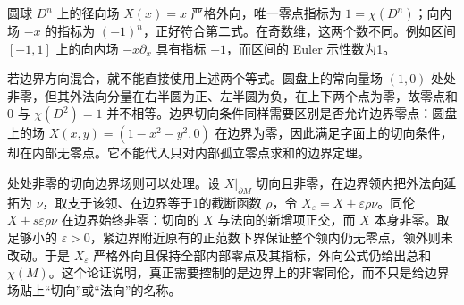圆球 \(D^n\) 上的径向场 \(X(x)=x\) 严格外向，唯一零点指标为 \(1=\chi(D^n)\)；向内场 \(-x\) 的指标为 \((-1)^n\)，正好符合第二式。在奇数维，这两个数不同。例如区间 \([-1,1]\) 上的向内场 \(-x\partial_x\) 具有指标 \(-1\)，而区间的 Euler 示性数为1。

\ProseParagraphBreak

若边界方向混合，就不能直接使用上述两个等式。圆盘上的常向量场 \((1,0)\) 处处非零，但其外法向分量在右半圆为正、左半圆为负，在上下两个点为零，故零点和 \(0\) 与 \(\chi(D^2)=1\) 并不相等。边界切向条件同样需要区别是否允许边界零点：圆盘上的场 \(X(x,y)=(1-x^2-y^2,0)\) 在边界为零，因此满足字面上的切向条件，却在内部无零点。它不能代入只对内部孤立零点求和的边界定理。

\ProseParagraphBreak

处处非零的切向边界场则可以处理。设 \(X|_{\partial M}\) 切向且非零，在边界领内把外法向延拓为 \(\nu\)，取支于该领、在边界等于1的截断函数 \(\rho\)，令 \(X_\varepsilon=X+\varepsilon\rho\nu\)。同伦 \(X+s\varepsilon\rho\nu\) 在边界始终非零：切向的 \(X\) 与法向的新增项正交，而 \(X\) 本身非零。取足够小的 \(\varepsilon>0\)，紧边界附近原有的正范数下界保证整个领内仍无零点，领外则未改动。于是 \(X_\varepsilon\) 严格外向且保持全部内部零点及其指标，外向公式仍给出总和 \(\chi(M)\)。这个论证说明，真正需要控制的是边界上的非零同伦，而不只是给边界场贴上“切向”或“法向”的名称。
